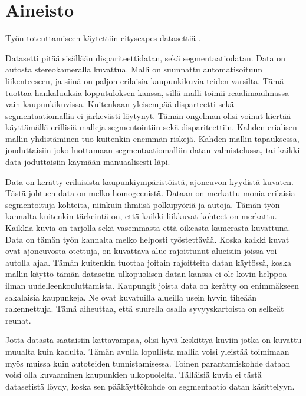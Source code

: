 \chapter{Aineisto}%
\label{ch:aineisto}

Työn toteuttamiseen käytettiin cityscapes datasettiä \cite{Cordts2016Cityscapes}.


Datasetti pitää sisällään dispariteettidatan, sekä segmentaatiodatan.
Data on autosta stereokameralla kuvattua.
Malli on suunnattu automatisoituun liikenteeseen, ja siinä on paljon erilaisia kaupunkikuvia teiden varsilta.
Tämä tuottaa hankaluuksia lopputuloksen kanssa, sillä malli toimii reaalimaailmassa vain kaupunkikuvissa.
Kuitenkaan yleisempää disparteetti sekä segmentaatiomallia ei järkevästi löytynyt. 
Tämän ongelman olisi voinut kiertää käyttämällä erillisiä malleja segmentointiin sekä dispariteettiin. 
Kahden erialisen mallin yhdistäminen tuo kuitenkin enemmän riskejä.
Kahden mallin tapauksessa, jouduttaisiin joko luottamaan segmentaatiomalliin datan valmistelussa, 
tai kaikki data joduttaisiin käymään manuaalisesti läpi.

Data on kerätty erilaisista kaupunkiympäristöistä, ajoneuvon kyydistä kuvaten.
Tästä johtuen data on melko homogeenistä. Dataan on merkattu monia erilaisia segmentoituja kohteita, niinkuin ihmiisä polkupyöriä ja autoja. 
Tämän työn kannalta kuitenkin tärkeintä on, että kaikki liikkuvat kohteet on merkattu.
Kaikkia kuvia on tarjolla sekä vasemmasta että oikeasta kamerasta kuvattuna.
Data on tämän työn kannalta melko helposti työstettävää. Koska kaikki kuvat ovat ajoneuvosta otettuja, on kuvattava alue rajoittunut alueisiin joissa voi autolla ajaa.
Tämän kuitenkin tuottaa joitain rajoitteita datan käytössä, koska mallin käyttö tämän datasetin ulkopuolisen datan kanssa ei ole kovin helppoa ilman uudelleenkouluttamista.
Kaupungit joista data on kerätty on enimmäkseen sakalaisia kaupunkeja.
Ne ovat kuvatuilla alueilla usein hyvin tiheään rakennettuja. 
Tämä aiheuttaa, että suurella osalla syvyyskartoista on selkeät reunat.

Jotta datasta saataisiin kattavampaa, olisi hyvä keskittyä kuviin jotka on kuvattu muualta kuin kadulta.
Tämän avulla lopullista mallia voisi yleistää toimimaan myös muissa kuin autoteiden tunnistamisessa.
Toinen parantamiskohde dataan voisi olla kuvaaminen kaupunkien ulkopuolelta.
Tälläisiä kuvia ei tästä datasetistä löydy, koska sen pääkäyttökohde on segmentaatio datan käsittelyyn.

